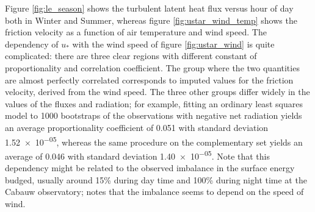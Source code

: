 \documentclass[12pt]{book}
\begin{document}
Figure \ref{fig:le_season} shows the turbulent latent heat flux versus hour of day both in Winter and Summer, whereas figure \ref{fig:ustar_wind_temp} shows the friction velocity as a function of air temperature and wind speed. The dependency of $u_*$ with the wind speed of figure \ref{fig:ustar_wind} is quite complicated: there are three clear regions with different constant of proportionality and correlation coefficient. The group where the two quantities are almost perfectly correlated corresponds to imputed values for the friction velocity, derived from the wind speed. The three other groups differ widely in the values of the fluxes and radiation; for example, fitting an ordinary least squares model to 1000 bootstraps of the observations with negative net radiation yields an average proportionality coefficient of \num{0.051} with standard deviation \num{1.52e-05}, whereas the same procedure on the complementary set yields an average of \num{0.046} with standard deviation \num{1.40e-05}. Note that this dependency might be related to the observed imbalance in the surface energy budged, usually around 15\% during day time and 100\% during night time at the Cabauw observatory; \cite{cabauwinsitu} notes that the imbalance seems to depend on the speed of wind.
\end{document}
